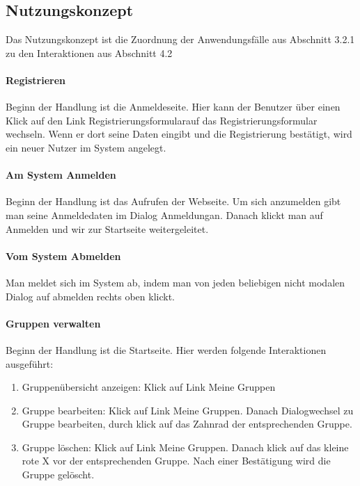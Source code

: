 \documentclass[12pt,a4paper]{article}
\begin{document}
{\subsection{Nutzungskonzept}
Das Nutzungskonzept ist die Zuordnung der Anwendungsfälle aus Abschnitt 3.2.1 zu den Interaktionen aus Abschnitt 4.2
\paragraph{Registrieren}
Beginn der Handlung ist die Anmeldeseite. Hier kann der Benutzer über einen Klick auf den Link \glqq Registrierungsformular\grqq auf das Registrierungsformular wechseln. Wenn er dort seine Daten eingibt und die Registrierung bestätigt, wird ein neuer Nutzer im System angelegt.

\paragraph{Am System Anmelden}
Beginn der Handlung ist das Aufrufen der Webseite. Um sich anzumelden gibt man seine Anmeldedaten im Dialog \glqq Anmeldung\grqq  an. Danach klickt man auf Anmelden und wir zur Startseite weitergeleitet.

\paragraph{Vom System Abmelden}
Man meldet sich im System ab, indem man von jeden beliebigen nicht modalen Dialog auf abmelden rechts oben klickt.

\paragraph{Gruppen verwalten}
Beginn der Handlung ist die Startseite. Hier werden folgende Interaktionen ausgeführt:
\begin{enumerate}
	\item \glqq Gruppenübersicht anzeigen\grqq: Klick auf Link \glqq Meine Gruppen\grqq
	\item \glqq Gruppe bearbeiten\grqq: Klick auf Link \glqq Meine Gruppen\grqq . Danach Dialogwechsel zu  \glqq Gruppe bearbeiten\grqq, durch klick auf das Zahnrad der entsprechenden Gruppe.
	\item \glqq Gruppe löschen\grqq: Klick auf Link \glqq Meine Gruppen\grqq . Danach klick auf das kleine rote X vor der entsprechenden Gruppe. Nach einer Bestätigung wird die Gruppe gelöscht.
\end{enumerate}

}
\end{document}
